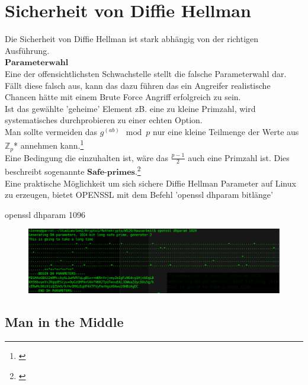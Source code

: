 \documentclass[a4paper,12pt]{scrartcl}
\begin{document}
\section{Sicherheit von Diffie Hellman}
Die Sicherheit von Diffie Hellman ist stark abhängig von der richtigen Ausführung.\\
\newline
$\textbf{Parameterwahl}$\\
Eine der offensichtlichsten Schwachstelle stellt die falsche Parameterwahl dar. Fällt diese falsch aus, kann das dazu führen das ein Angreifer realistische Chancen hätte mit einem Brute Force Angriff erfolgreich zu sein.\\
Ist das gewählte 'geheime' Element zB. eine zu kleine Primzahl, wird systematisches durchprobieren zu einer echten Option.\\
Man sollte vermeiden das $g^(ab) \mod p$ nur eine kleine Teilmenge der Werte aus $\mathbb{Z}_{p}$* annehmen kann.\footnote{\cite{galbraith2012mathematics}}\\
Eine Bedingung die einzuhalten ist, wäre das $\frac{p-1}{2}$ auch eine Primzahl ist. Dies beschreibt sogenannte $\textbf{Safe-primes}$.\footnote{\cite{10.1007/978-3-540-39927-8_28}}\\

Eine praktische Möglichkeit um sich sichere Diffie Hellman Parameter auf Linux zu erzeugen, bietet OPENSSL mit dem Befehl 'openssl dhparam bitlänge'
\begin{center}
 openssl dhparam 1096

\end{center}
\begin{figure}[h]
\hspace{-1.6cm}
\includegraphics[scale=0.41]{dh}     
\end{figure}
\newpage
\subsection{Man in the Middle} 
\end{document}

